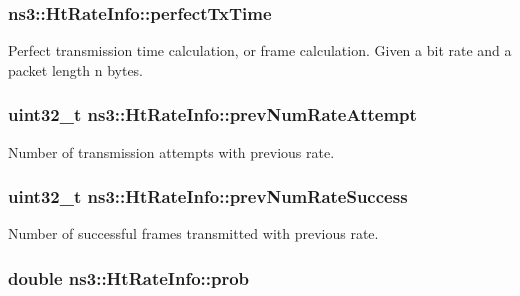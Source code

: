\subsubsection[{\texorpdfstring{perfect\+Tx\+Time}{perfectTxTime}}]{ ns3\+::\+Ht\+Rate\+Info\+::perfect\+Tx\+Time}\hypertarget{structns3_1_1HtRateInfo_a66101cd7c403ad7d1df0532eca3e9354}{}\label{structns3_1_1HtRateInfo_a66101cd7c403ad7d1df0532eca3e9354}
Perfect transmission time calculation, or frame calculation. Given a bit rate and a packet length n bytes. 
\subsubsection[{\texorpdfstring{prev\+Num\+Rate\+Attempt}{prevNumRateAttempt}}]{\setlength{\rightskip}{0pt plus 5cm}uint32\+\_\+t ns3\+::\+Ht\+Rate\+Info\+::prev\+Num\+Rate\+Attempt}\hypertarget{structns3_1_1HtRateInfo_ad3b1b49cc4954e8019d598ab196a1d55}{}\label{structns3_1_1HtRateInfo_ad3b1b49cc4954e8019d598ab196a1d55}


Number of transmission attempts with previous rate. 

\subsubsection[{\texorpdfstring{prev\+Num\+Rate\+Success}{prevNumRateSuccess}}]{\setlength{\rightskip}{0pt plus 5cm}uint32\+\_\+t ns3\+::\+Ht\+Rate\+Info\+::prev\+Num\+Rate\+Success}\hypertarget{structns3_1_1HtRateInfo_addf7ac29ab4fed7e27c5ccc759c18efb}{}\label{structns3_1_1HtRateInfo_addf7ac29ab4fed7e27c5ccc759c18efb}


Number of successful frames transmitted with previous rate. 

\subsubsection[{\texorpdfstring{prob}{prob}}]{\setlength{\rightskip}{0pt plus 5cm}double ns3\+::\+Ht\+Rate\+Info\+::prob}\hypertarget{structns3_1_1HtRateInfo_a4b46afa48d35b797553455bfce1fc24c}{}\label{structns3_1_1HtRateInfo_a4b46afa48d35b797553455bfce1fc24c}


